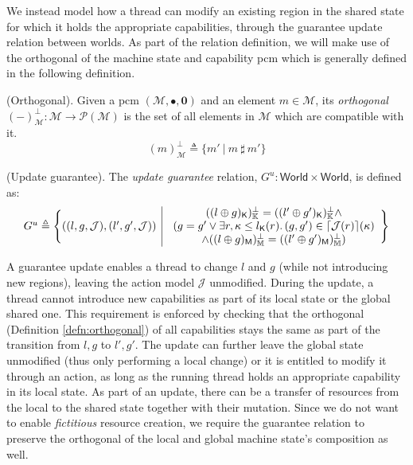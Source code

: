 We instead model how a thread can modify an existing region in the shared state for which it holds the appropriate capabilities, through the guarantee update relation between worlds. As part of the relation definition, we will make use of the orthogonal of the machine state and capability pcm which is generally defined in the following definition.

\begin{defn}
	\label{defn:orthogonal}
	(Orthogonal).
	Given a pcm $(\mathcal{M}, \bullet, \mathbf{0})$ and an element $m \in \mathcal{M}$, its \emph{orthogonal} $(-)^\bot_\mathcal{M} : \mathcal{M} \rightarrow \mathcal{P}(\mathcal{M})$ is the set of all elements in $\mathcal{M}$ which are compatible with it.
\[
	(m)^\bot_\mathcal{M} \triangleq \{m'\ |\ m\ \sharp\ m' \}
\]
\end{defn}

\begin{defn}
	(Update guarantee).
	The \emph{update guarantee} relation, $G^u : \mathsf{World} \times \mathsf{World}$, is defined as:
	\[
	\begin{array}{r | l}
		G^u \triangleq \Bigg\{ ((l, g, \mathcal{J}), (l', g', \mathcal{J}))
		&
		\begin{array}{c}
			((l \oplus g)_\mathsf{K})_\mathbb{K}^\bot = ((l' \oplus g')_\mathsf{K})_\mathbb{K}^\bot \land \\
			(g = g' \lor \exists r, \kappa \leq l_\mathsf{K}(r) \ldotp (g, g') \in \lceil \mathcal{J}(r) \rceil(\kappa)  \\ \land ((l \oplus g)_\mathsf{M})_\mathbb{M}^\bot = ((l' \oplus g')_\mathsf{M})_\mathbb{M}^\bot )
		\end{array}
		\Bigg\}
	\end{array}
	\]
\end{defn}
A guarantee update enables a thread to change $l$ and $g$ (while not introducing new regions), leaving the action model $\mathcal{J}$ unmodified. During the update, a thread cannot introduce new capabilities as part of its local state or the global shared one. This requirement is enforced by checking that the orthogonal (Definition \ref{defn:orthogonal}) of all capabilities stays the same as part of the transition from $l, g$ to $l', g'$. The update can further leave the global state unmodified (thus only performing a local change) or it is entitled to modify it through an action, as long as the running thread holds an appropriate capability in its local state. As part of an update, there can be a transfer of resources from the local to the shared state together with their mutation. Since we do not want to enable \textit{fictitious} resource creation, we require the guarantee relation to preserve the orthogonal of the local and global machine state's composition as well.

